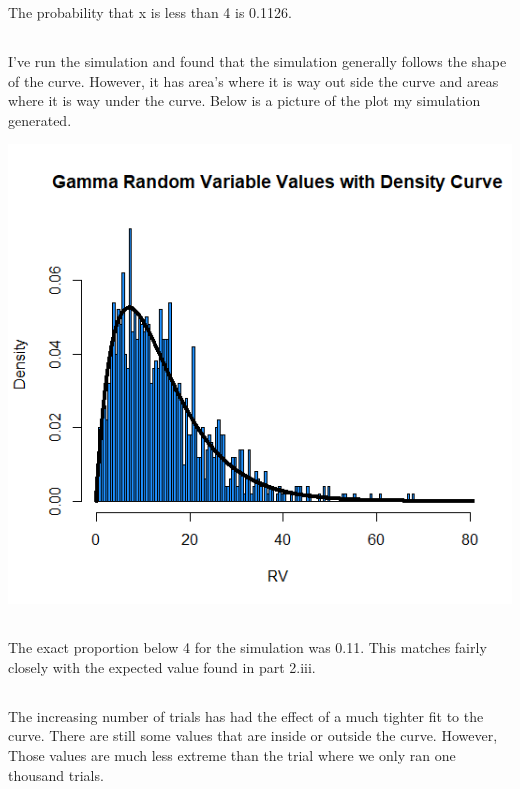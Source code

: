 \documentclass[letterpaper, onecolumn,10pt]{IEEEtran}
\begin{document}
                The probability that x is less than 4 is 0.1126.\\
            \subsection{}
                I've run the simulation and found that the simulation generally follows the shape of the curve. However, it has area's where it is way out side the curve and areas where it is way under the curve. Below is a picture of the plot my simulation generated.
                
                \includegraphics{week2/GammaSimOne.png}
                
            \subsection{}
                The exact proportion below 4 for the simulation was 0.11. This matches fairly closely with the expected value found in part 2.iii.\\
                
            \subsection{}
                The increasing number of trials has had the effect of a much tighter fit to the curve. There are still some values that are inside or outside the curve. However, Those values are much less extreme than the trial where we only ran one thousand trials.\\
                
\end{document}
